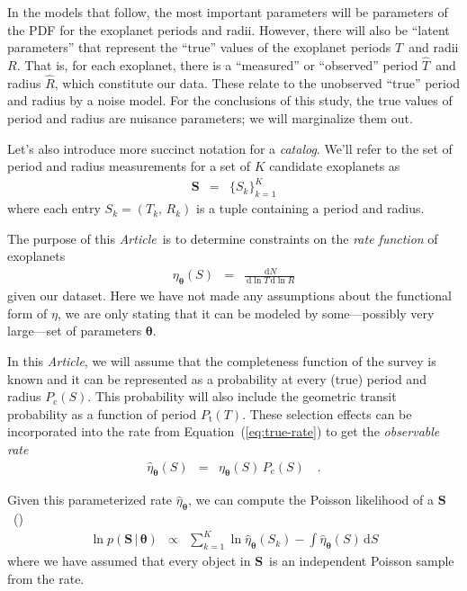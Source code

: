 \documentclass[12pt,preprint]{aastex}
\newcommand{\paper}{\emph{Article}}
\newcommand{\Eq}[1]{Equation~(\ref{eq:#1})}
\newcommand{\eq}[1]{\Eq{#1}}
\newcommand{\eqlabel}[1]{\label{eq:#1}}
\newcommand{\dd}{\ensuremath{\,\mathrm{d}}}
\newcommand{\bvec}[1]{\ensuremath{\boldsymbol{#1}}}
\newcommand{\rate}{\ensuremath{\eta}}
\newcommand{\ratepars}{{\ensuremath{\bvec{\theta}}}}
\newcommand{\obs}[1]{\ensuremath{\hat{#1}}}
\newcommand{\radius}{\ensuremath{R}}
\newcommand{\period}{\ensuremath{T}}
\newcommand{\completeness}{{\ensuremath{P_\mathrm{c}}}}
\newcommand{\transitprob}{{\ensuremath{P_\mathrm{t}}}}
\newcommand{\entry}{\ensuremath{S}}
\newcommand{\catalog}{{\ensuremath{\bvec{\entry}}}}
\begin{document}
In the models that follow, the most important parameters will be parameters
of the PDF for the exoplanet periods and radii.
However, there will also be ``latent parameters'' that represent the ``true''
values of the exoplanet periods \period\ and radii \radius.
That is, for each exoplanet, there is a ``measured'' or ``observed'' period
\obs{\period}\ and radius \obs{\radius}, which constitute our data.
These relate to the unobserved ``true'' period and radius by a noise model.
For the conclusions of this study, the true values of period and radius are
nuisance parameters; we will marginalize them out.

Let's also introduce more succinct notation for a \emph{catalog}.
We'll refer to the set of period and radius measurements for a set of $K$
candidate exoplanets as
\begin{eqnarray}
\catalog &=& \{\entry_k\}_{k=1}^K
\end{eqnarray}
where each entry $\entry_k = (\period_k,\,\radius_k)$ is a tuple containing a
period and radius.

The purpose of this \paper\ is to determine constraints on the \emph{rate
function} of exoplanets
\begin{eqnarray}\eqlabel{true-rate}
\rate_\ratepars (\entry)
&=& \frac{\dd N}{\dd\ln\period\dd\ln\radius}
\end{eqnarray}
given our dataset.
Here we have not made any assumptions about the functional form of \rate, we
are only stating that it can be modeled by some---possibly very large---set of
parameters \ratepars.

In this \paper, we will assume that the completeness function of the survey is
known and it can be represented as a probability at every (true) period and
radius $\completeness (\entry)$.
This probability will also include the geometric transit probability as a
function of period $\transitprob (\period)$.
These selection effects can be incorporated into the rate from \eq{true-rate}
to get the \emph{observable rate}
\begin{eqnarray}\eqlabel{obs-rate}
\obs{\rate}_\ratepars (\entry)
&=& \rate_\ratepars(\entry)\,\completeness(\entry)\quad.
\end{eqnarray}

Given this parameterized rate $\obs{\rate}_\ratepars$, we can compute the
Poisson likelihood of a \catalog\ (\citealt{tabachnik,youdin,dong})
\begin{eqnarray}\eqlabel{true-like}
\ln p(\catalog\,|\,\ratepars) &\propto&
\sum_{k=1}^K \ln\obs{\rate}_\ratepars (\entry_k)
- \int \obs{\rate}_\ratepars (\entry) \dd\entry
\end{eqnarray}
where we have assumed that every object in \catalog\ is an independent
Poisson sample from the rate.
\end{document}
